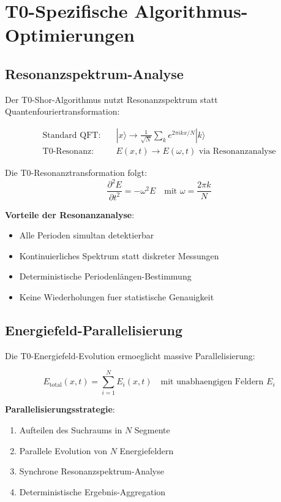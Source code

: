 \documentclass[12pt,a4paper]{article}
\newcommand{\Efield}{E}
\begin{document}
	\section{T0-Spezifische Algorithmus-Optimierungen}
	
	\subsection{Resonanzspektrum-Analyse}
	
	Der T0-Shor-Algorithmus nutzt Resonanzspektrum statt Quantenfouriertransformation:
	
	\begin{align}
		\text{Standard QFT}: \quad &|x\rangle \rightarrow \frac{1}{\sqrt{N}}\sum_k e^{2\pi ikx/N}|k\rangle \\
		\text{T0-Resonanz}: \quad &\Efield(x,t) \rightarrow \Efield(\omega,t) \text{ via Resonanzanalyse}
	\end{align}
	
	Die T0-Resonanztransformation folgt:
	\begin{equation}
		\frac{\partial^2 \Efield}{\partial t^2} = -\omega^2 \Efield \quad \text{mit } \omega = \frac{2\pi k}{N}
	\end{equation}
	
	\textbf{Vorteile der Resonanzanalyse}:
	\begin{itemize}
		\item Alle Perioden simultan detektierbar
		\item Kontinuierliches Spektrum statt diskreter Messungen  
		\item Deterministische Periodenlängen-Bestimmung
		\item Keine Wiederholungen fuer statistische Genauigkeit
	\end{itemize}
	
	\subsection{Energiefeld-Parallelisierung}
	
	Die T0-Energiefeld-Evolution ermoeglicht massive Parallelisierung:
	
	\begin{equation}
		\Efield_{\text{total}}(x,t) = \sum_{i=1}^{N} \Efield_i(x,t) \quad \text{mit unabhaengigen Feldern } \Efield_i
	\end{equation}
	
	\textbf{Parallelisierungsstrategie}:
	\begin{enumerate}
		\item Aufteilen des Suchraums in $N$ Segmente
		\item Parallele Evolution von $N$ Energiefeldern
		\item Synchrone Resonanzspektrum-Analyse
		\item Deterministische Ergebnis-Aggregation
	\end{enumerate}
	
\end{document}
